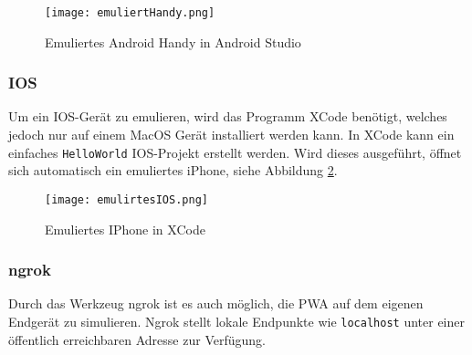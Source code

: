 \begin{figure}[!htb]
    \centering
    \texttt{[image: emuliertHandy.png]}
    \caption {Emuliertes Android Handy in Android Studio}
    \label{Android1}
\end{figure}

\subsubsection{IOS}

Um ein IOS-Gerät zu emulieren, wird das Programm XCode benötigt, welches jedoch nur auf einem MacOS Gerät installiert werden kann. In XCode kann ein einfaches \texttt{HelloWorld} IOS-Projekt erstellt werden. Wird dieses ausgeführt, öffnet sich automatisch ein emuliertes iPhone, siehe Abbildung \ref{img:emuIOS}.

\begin{figure}
    \centering
    \texttt{[image: emulirtesIOS.png]}
    \caption{Emuliertes IPhone in XCode}
    \label{img:emuIOS}
\end{figure}

\subsubsection{ngrok}
Durch das Werkzeug ngrok ist es auch möglich, die PWA auf dem eigenen Endgerät zu simulieren. Ngrok stellt lokale Endpunkte wie \texttt{localhost} unter einer öffentlich erreichbaren Adresse zur Verfügung.



